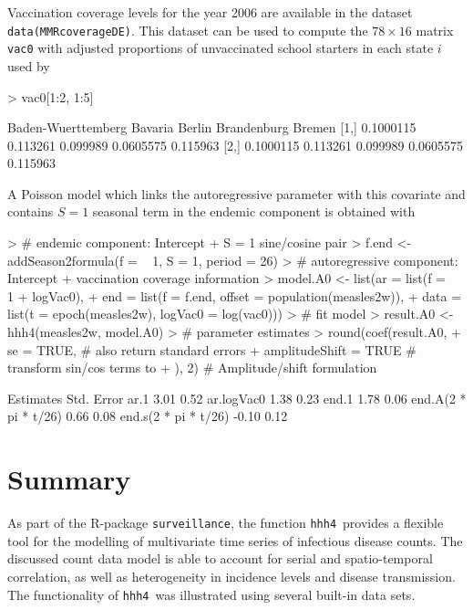 \documentclass[a4paper,11pt]{article}
\newcommand{\surveillance}{\texttt{surveillance}}
\newcommand{\code}[1]{\texttt{#1}}
\newcommand{\hhh}{\texttt{hhh4}}
\newcommand{\R}{\textsf{R}}
\begin{document}
Vaccination coverage levels for the year 2006 are available in the dataset
\code{data(MMRcoverageDE)}. This dataset can be used to compute
the $78\times 16$ matrix \code{vac0} with adjusted
proportions of unvaccinated school starters in each state $i$ used by
\cite{herzog-etal-2010} 
\begin{Schunk}
\begin{Sinput}
> vac0[1:2, 1:5]
\end{Sinput}
\begin{Soutput}
     Baden-Wuerttemberg  Bavaria   Berlin Brandenburg   Bremen
[1,]          0.1000115 0.113261 0.099989   0.0605575 0.115963
[2,]          0.1000115 0.113261 0.099989   0.0605575 0.115963
\end{Soutput}
\end{Schunk}
A Poisson model which links the autoregressive parameter with this covariate
and contains $S=1$ seasonal term in the endemic component 
\citep[cf.~model A0 in Tab.~3 in ][]{herzog-etal-2010} is obtained with
\begin{Schunk}
\begin{Sinput}
> # endemic component: Intercept + S = 1 sine/cosine pair
> f.end <- addSeason2formula(f = ~ 1, S = 1, period = 26)
> # autoregressive component: Intercept + vaccination coverage information
> model.A0 <- list(ar = list(f = ~ 1 + logVac0),
+                  end = list(f = f.end, offset = population(measles2w)),
+                  data = list(t = epoch(measles2w), logVac0 = log(vac0)))
> # fit model
> result.A0 <- hhh4(measles2w, model.A0)    
> # parameter estimates
> round(coef(result.A0, 
+            se = TRUE,              # also return standard errors
+            amplitudeShift = TRUE   # transform sin/cos terms to 
+            ), 2)                   # Amplitude/shift formulation
\end{Sinput}
\begin{Soutput}
                     Estimates Std. Error
ar.1                      3.01       0.52
ar.logVac0                1.38       0.23
end.1                     1.78       0.06
end.A(2 * pi * t/26)      0.66       0.08
end.s(2 * pi * t/26)     -0.10       0.12
\end{Soutput}
\end{Schunk}

 \section{Summary}
As part of the \R-package \surveillance, the function \hhh\ provides
a flexible tool for the modelling of multivariate time series 
of infectious disease counts. The discussed count data model is able to
account for serial and spatio-temporal correlation, as well as
heterogeneity in incidence levels and disease transmission. 
The functionality of \hhh\ was illustrated using several built-in data 
sets.


\end{document}
